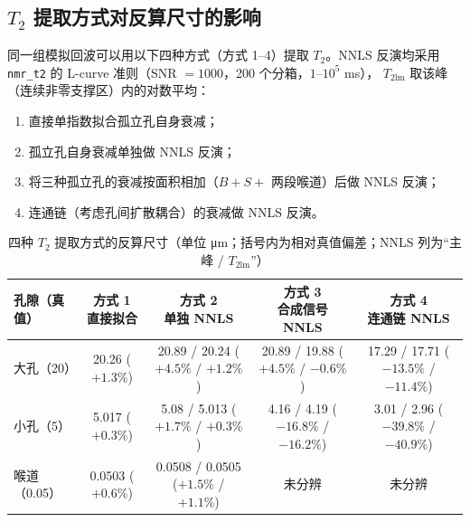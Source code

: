 \documentclass[11pt,a4paper]{article}
\begin{document}
\subsection{$T_2$ 提取方式对反算尺寸的影响}

同一组模拟回波可以用以下四种方式（方式 1–4）提取 $T_2$。NNLS 反演均采用 \texttt{nmr\_t2} 的 L-curve 准则（SNR $=1000$，200 个分箱，$1$–$10^5$ ms），
$T_{2\mathrm{lm}}$ 取该峰（连续非零支撑区）内的对数平均：
\begin{enumerate}
\item 直接单指数拟合孤立孔自身衰减；
\item 孤立孔自身衰减单独做 NNLS 反演；
\item 将三种孤立孔的衰减按面积相加（$B+S+$ 两段喉道）后做 NNLS 反演；
\item 连通链（考虑孔间扩散耦合）的衰减做 NNLS 反演。
\end{enumerate}

\begin{table}[h]
\centering
\caption{四种 $T_2$ 提取方式的反算尺寸（单位 \si{\micro m}；括号内为相对真值偏差；NNLS 列为“主峰 / $T_{2\mathrm{lm}}$”）}
\small
\begin{tabular}{lcccc}
\toprule
孔隙（真值） & \shortstack{方式 1\\直接拟合} & \shortstack{方式 2\\单独 NNLS} & \shortstack{方式 3\\合成信号 NNLS} & \shortstack{方式 4\\连通链 NNLS} \\
\midrule
大孔（20） & \shortstack{20.26\\($+1.3\%$)} & \shortstack{20.89 / 20.24\\($+4.5\%$ / $+1.2\%$)} & \shortstack{20.89 / 19.88\\($+4.5\%$ / $-0.6\%$)} & \shortstack{17.29 / 17.71\\($-13.5\%$ / $-11.4\%$)} \\[3pt]
小孔（5） & \shortstack{5.017\\($+0.3\%$)} & \shortstack{5.08 / 5.013\\($+1.7\%$ / $+0.3\%$)} & \shortstack{4.16 / 4.19\\($-16.8\%$ / $-16.2\%$)} & \shortstack{3.01 / 2.96\\($-39.8\%$ / $-40.9\%$)} \\[3pt]
喉道（0.05） & \shortstack{0.0503\\($+0.6\%$)} & \shortstack{0.0508 / 0.0505\\($+1.5\%$ / $+1.1\%$)} & 未分辨 & 未分辨 \\
\bottomrule
\end{tabular}
\end{table}
\end{document}
